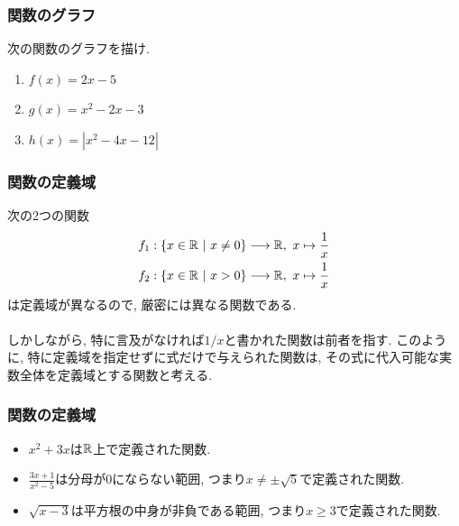 \begin{frame}
\frametitle{関数のグラフ}   


\begin{Prob}
次の関数のグラフを描け. 
\begin{enumerate}
\item $f(x)=2x-5$
\item $g(x)=x^2-2x-3$
\item $h(x)=|x^2-4x-12|$
\end{enumerate}
\end{Prob}


\end{frame}







\begin{frame}
\frametitle{関数の定義域}

次の2つの関数
\begin{align*}
f_1: \{ x \in \mathbb{R} \ | \ x \neq 0\} \longrightarrow \mathbb{R}, \ x \mapsto \frac{1}{x}\\
f_2: \{ x \in \mathbb{R} \ | \ x > 0\} \longrightarrow \mathbb{R}, \ x \mapsto \frac{1}{x}
\end{align*}
は定義域が異なるので, 厳密には異なる関数である. \\
\ \\

しかしながら, 特に言及がなければ$1/x$と書かれた関数は前者を指す. 
このように, 特に定義域を指定せずに式だけで与えられた関数は, その式に代入可能な実数全体を定義域とする関数と考える.


\end{frame}




\begin{frame}
\frametitle{関数の定義域}

\begin{itemize}
\item $x^2 + 3x$は$\mathbb{R}$上で定義された関数. 
\item $\frac{3x+1}{x^2-5}$は分母が$0$にならない範囲, つまり$x\neq \pm \sqrt{5}$で定義された関数. 
\item $\sqrt{x-3}$は平方根の中身が非負である範囲, つまり$x\ge 3$で定義された関数. 
\end{itemize}

\end{frame}


